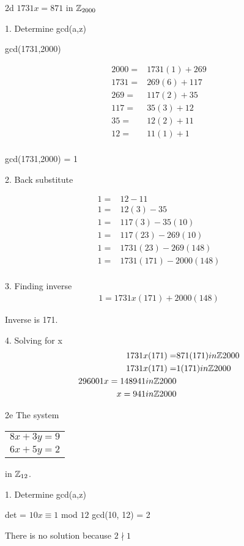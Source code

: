 \begin{question}{2d}
$1731x = 871$ in $\mathbb{Z}_{2000}$

1. Determine gcd(a,z)

gcd(1731,2000)

\begin{align*}
2000 =& 1731(1) + 269 \\
1731 =& 269(6) + 117 \\
269 =& 117(2) + 35 \\
117 =& 35(3) + 12 \\
35 =& 12(2) + 11 \\
12 =& 11(1) + 1 \\
\end{align*}

gcd(1731,2000) = 1

2. Back substitute

\begin{align*}
1 =& 12 - 11\\
1 =& 12(3) - 35\\
1 =& 117(3) - 35(10)\\
1 =& 117(23) - 269(10)\\
1 =& 1731(23) - 269(148)\\
1 =& 1731(171) - 2000(148)\\
\end{align*}

3. Finding inverse
\begin{align*}
1 = 1731x(171) + 2000(148)
\end{align*}

Inverse is 171. 

4. Solving for x
\begin{align*}
1731x(171) =& 871(171) in \mathbb{Z}{2000}\\
1731x(171) =& 1(171) in \mathbb{Z}{2000}\\
296001x = 148941 in \mathbb{Z}{2000}\\
x = 941 in \mathbb{Z}{2000}\\
\end{align*}
\end{question}

\begin{question}{2e}
The system 
\begin{tabular}{l}
$8x + 3y=9$\\
$6x + 5y=2$
\end{tabular}
in $\mathbb{Z}_{12}$.

1. Determine gcd(a,z)

det = $10x \equiv 1$ mod $12$
gcd(10, 12) = 2

There is no solution because $2\nmid 1$

\end{question}

